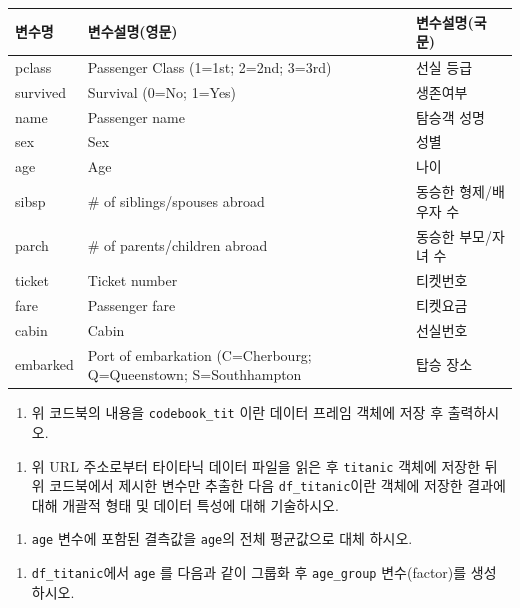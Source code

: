 \documentclass[
  11pt,
]{krantz}
\providecommand{\tightlist}{%
  \setlength{\itemsep}{0pt}\setlength{\parskip}{0pt}}
\begin{document}
\begin{tabular}{l|l|l}
\hline
변수명 & 변수설명(영문) & 변수설명(국문)\\
\hline
pclass & Passenger Class (1=1st; 2=2nd; 3=3rd) & 선실 등급\\
\hline
survived & Survival (0=No; 1=Yes) & 생존여부\\
\hline
name & Passenger name & 탐승객 성명\\
\hline
sex & Sex & 성별\\
\hline
age & Age & 나이\\
\hline
sibsp & \# of siblings/spouses abroad & 동승한 형제/배우자 수\\
\hline
parch & \# of parents/children abroad & 동승한 부모/자녀 수\\
\hline
ticket & Ticket number & 티켓번호\\
\hline
fare & Passenger fare & 티켓요금\\
\hline
cabin & Cabin & 선실번호\\
\hline
embarked & Port of embarkation (C=Cherbourg; Q=Queenstown; S=Southhampton & 탑승 장소\\
\hline
\end{tabular}

\normalsize

\begin{enumerate}
\def\labelenumi{\alph{enumi})}
\tightlist
\item
  위 코드북의 내용을 \texttt{codebook\_tit} 이란 데이터 프레임 객체에 저장 후 출력하시오.
\end{enumerate}

\begin{enumerate}
\def\labelenumi{\alph{enumi})}
\setcounter{enumi}{1}
\tightlist
\item
  위 URL 주소로부터 타이타닉 데이터 파일을 읽은 후 \texttt{titanic} 객체에 저장한 뒤 위 코드북에서 제시한 변수만 추출한 다음 \texttt{df\_titanic}이란 객체에 저장한 결과에 대해 개괄적 형태 및 데이터 특성에 대해 기술하시오.
\end{enumerate}

\begin{enumerate}
\def\labelenumi{\alph{enumi})}
\setcounter{enumi}{2}
\tightlist
\item
  \texttt{age} 변수에 포함된 결측값을 \texttt{age}의 전체 평균값으로 대체 하시오.
\end{enumerate}

\begin{enumerate}
\def\labelenumi{\alph{enumi})}
\setcounter{enumi}{3}
\tightlist
\item
  \texttt{df\_titanic}에서 \texttt{age} 를 다음과 같이 그룹화 후 \texttt{age\_group} 변수(factor)를 생성 하시오.
\end{enumerate}
\end{document}
